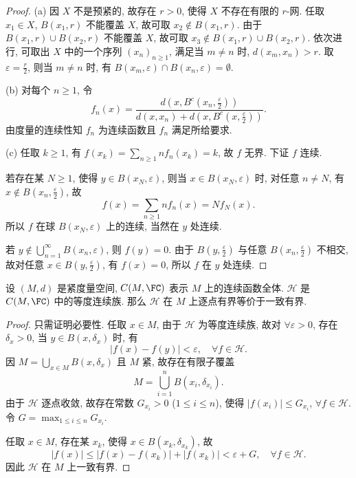 \documentclass{mathexercise}
\begin{document}
\begin{proof}
    (a) 因 $X$ 不是预紧的, 故存在 $r>0$, 使得 $X$ 不存在有限的 $r$-网.
    任取 $x_1\in X$, $B(x_1,r)$ 不能覆盖 $X$, 故可取 $x_2\notin B(x_1,r)$.
    由于 $B(x_1,r)\cup B(x_2,r)$ 不能覆盖 $X$, 故可取 $x_3\notin B(x_1,r)\cup B(x_2,r)$.
    依次进行, 可取出 $X$ 中的一个序列 $(x_n)_{n\geq 1}$, 满足当 $m\neq n$ 时, $d(x_m,x_n)>r$.
    取 $\varepsilon=\frac{r}{2}$, 则当 $m\neq n$ 时, 有 $B(x_m,\varepsilon)\cap B(x_n,\varepsilon)=\emptyset$.

    (b) 对每个 $n\geq 1$, 令
    \[f_n(x)=\frac{d(x,B^c(x_n,\frac{\varepsilon}{2}))}{d(x,x_n)+d(x,B^c(x,\frac{\varepsilon}{2}))}.\]
    由度量的连续性知 $f_n$ 为连续函数且 $f_n$ 满足所给要求.

    (c) 任取 $k\geq 1$, 有 $f(x_k)=\sum_{n\geq 1}nf_n(x_k)=k$, 故 $f$ 无界.
    下证 $f$ 连续. 
    
    若存在某 $N\geq 1$, 使得 $y\in B(x_N,\varepsilon)$, 则当 $x\in B(x_N,\varepsilon)$ 时,
    对任意 $n\neq N$, 有 $x\notin B(x_n,\frac{\varepsilon}{2})$, 故
    \[f(x)=\sum_{n\geq 1}nf_n(x)=Nf_N(x).\]
    所以 $f$ 在球 $B(x_N,\varepsilon)$ 上的连续, 当然在 $y$ 处连续.

    若 $y\notin\bigcup_{n=1}^{\infty} B(x_n,\varepsilon)$, 则 $f(y)=0$.
    由于 $B(y,\frac{\varepsilon}{2})$ 与任意 $B(x_n,\frac{\varepsilon}{2})$ 不相交,
    故对任意 $x\in B(y,\frac{\varepsilon}{2})$, 有 $f(x)=0$, 所以 $f$ 在 $y$ 处连续.
\end{proof}



\begin{exercise}
    设 $(M,d)$ 是紧度量空间, $C(M,\FC)$ 表示 $M$ 上的连续函数全体. 
    $\mathcal{H}$ 是 $C(M, \FC)$ 中的等度连续族. 那么 $\mathcal{H}$ 在 $M$ 上逐点有界等价于一致有界.
\end{exercise}

\begin{proof}
    只需证明必要性.
    任取 $x\in M$, 由于 $\mathcal{H}$ 为等度连续族, 故对 $\forall\varepsilon>0$,
    存在 $\delta_x>0$, 当 $y\in B(x,\delta_x)$ 时, 有
    \[|f(x)-f(y)|<\varepsilon,\quad\forall f\in\mathcal{H}.\]
    因 $M=\bigcup_{x\in M}B(x,\delta_x)$ 且 $M$ 紧, 故存在有限子覆盖
    \[M=\bigcup_{i=1}^n B(x_i,\delta_{x_i}).\]
    由于 $\mathcal{H}$ 逐点收敛, 故存在常数 $G_{x_i}>0$ ($1\leq i\leq n$),
    使得 $|f(x_i)|\leq G_{x_i}$, $\forall f\in\mathcal{H}$.
    令 $G=\max_{1\leq i\leq n}G_{x_i}$.

    任取 $x\in M$, 存在某 $x_k$, 使得 $x\in B(x_k,\delta_{x_k})$, 故
    \[|f(x)|\leq |f(x)-f(x_k)|+|f(x_k)|<\varepsilon+G,\quad\forall f\in\mathcal{H}.\]
    因此 $\mathcal{H}$ 在 $M$ 上一致有界.
\end{proof}
\end{document}
